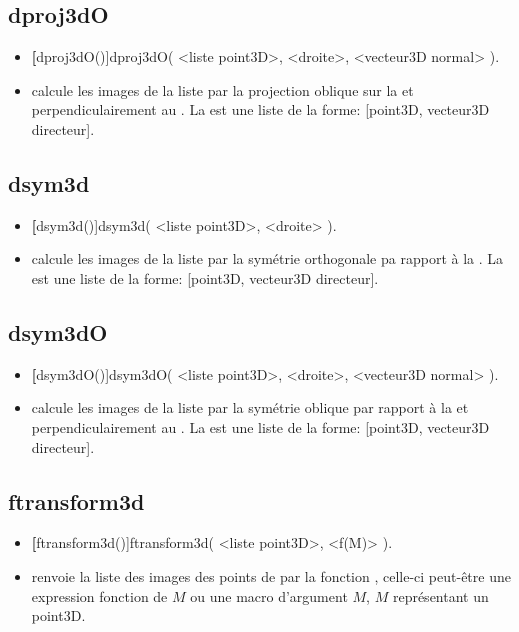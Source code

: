\subsection{dproj3dO}
\begin{itemize}
 \item \util \textbf[dproj3dO()]{dproj3dO( <liste point3D>, <droite>, <vecteur3D normal> )}.
 \item \desc calcule les images de la liste par la projection oblique sur la  et perpendiculairement au . La  est une liste de la forme: [point3D, vecteur3D directeur].
\end{itemize}

\subsection{dsym3d}
\begin{itemize}
 \item \util \textbf[dsym3d()]{dsym3d( <liste point3D>, <droite> )}.
 \item \desc calcule les images de la liste par la symétrie orthogonale pa rapport à la . La  est une liste de la forme: [point3D, vecteur3D directeur].
\end{itemize}

\subsection{dsym3dO}
\begin{itemize}
 \item \util \textbf[dsym3dO()]{dsym3dO( <liste point3D>, <droite>, <vecteur3D normal> )}.
 \item \desc calcule les images de la liste par la symétrie oblique par rapport à la  et perpendiculairement au . La  est une liste de la forme: [point3D, vecteur3D directeur].
\end{itemize}

\subsection{ftransform3d}
\begin{itemize}
 \item \util \textbf[ftransform3d()]{ftransform3d( <liste point3D>, <f(M)> )}.
 \item \desc renvoie la liste des images des points de  par la fonction , celle-ci peut-être une expression fonction de $M$ ou une macro d'argument $M$, $M$ représentant un point3D.
\end{itemize}

